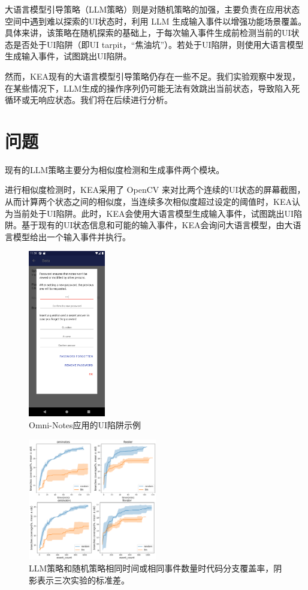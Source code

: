 \documentclass[twocolumn, 10pt]{article}
\newcommand{\kea}{K{\small\MakeUppercase{ea}}}
\begin{document}
大语言模型引导策略（LLM策略）则是对随机策略的加强，主要负责在应用状态空间中遇到难以探索的UI状态时，利用 LLM 生成输入事件以增强功能场景覆盖。具体来讲，该策略在随机探索的基础上，于每次输入事件生成前检测当前的UI状态是否处于UI陷阱（即UI tarpit，``焦油坑''\cite{khan2024aurora}）。若处于UI陷阱，则使用大语言模型生成输入事件，试图跳出UI陷阱。

然而，\kea 现有的大语言模型引导策略仍存在一些不足。我们实验观察中发现，在某些情况下，LLM生成的操作序列仍可能无法有效跳出当前状态，导致陷入死循环或无响应状态。我们将在后续进行分析。

\section{问题}

现有的LLM策略主要分为相似度检测和生成事件两个模块。

进行相似度检测时，\kea 采用了 OpenCV 来对比两个连续的UI状态的屏幕截图，从而计算两个状态之间的相似度，当连续多次相似度超过设定的阈值时，\kea 认为当前处于UI陷阱。此时，\kea 会使用大语言模型生成输入事件，试图跳出UI陷阱。基于现有的UI状态信息和可能的输入事件，\kea 会询问大语言模型，由大语言模型给出一个输入事件并执行。

\begin{figure}[t]
    \centering
    \includegraphics[width=0.3\textwidth]{1}
    \caption{Omni-Notes应用的UI陷阱示例}
    \label{fig:omni_tarpit}
\end{figure}


\begin{figure}[t]
    \centering
    \includegraphics[width=0.5\textwidth]{llm_test}
    \caption{LLM策略和随机策略相同时间或相同事件数量时代码分支覆盖率，阴影表示三次实验的标准差。}
    \label{fig:llm_test}
\end{figure}
\end{document}
